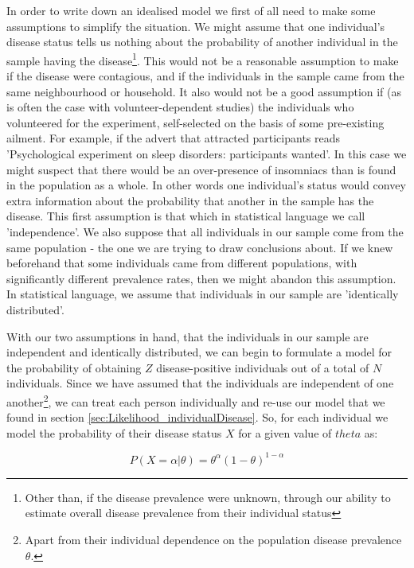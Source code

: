\documentclass[11pt,fullpage]{book}
\begin{document}
In order to write down an idealised model we first of all need to make some assumptions to simplify the situation. We might assume that one individual's disease status tells us nothing about the probability of another individual in the sample having the disease\footnote{Other than, if the disease prevalence were unknown, through our ability to estimate overall disease prevalence from their individual status}. This would not be a reasonable assumption to make if the disease were contagious, and if the individuals in the sample came from the same neighbourhood or household. It also would not be a good assumption if (as is often the case with volunteer-dependent studies) the individuals who volunteered for the experiment, self-selected on the basis of some pre-existing ailment. For example, if the advert that attracted participants reads 'Psychological experiment on sleep disorders: participants wanted'. In this case we might suspect that there would be an over-presence of insomniacs than is found in the population as a whole. In other words one individual's status would convey extra information about the probability that another in the sample has the disease. This first assumption is that which in statistical language we call 'independence'. We also suppose that all individuals in our sample come from the same population - the one we are trying to draw conclusions about. If we knew beforehand that some individuals came from different populations, with significantly different prevalence rates, then we might abandon this assumption. In statistical language, we assume that individuals in our sample are 'identically distributed'.

With our two assumptions in hand, that the individuals in our sample are independent and identically distributed, we can begin to formulate a model for the probability of obtaining $Z$ disease-positive individuals out of a total of $N$ individuals. Since we have assumed that the individuals are independent of one another\footnote{Apart from their individual dependence on the population disease prevalence $\theta$.}, we can treat each person individually and re-use our model that we found in section \ref{sec:Likelihood_individualDisease}. So, for each individual we model the probability of their disease status $X$ for a given value of $theta$ as:

\begin{equation}
P(X=\alpha|\theta) = \theta^\alpha(1-\theta)^{1-\alpha}
\end{equation}\label{eq:Likelihood_bernoulli1}
\end{document}
